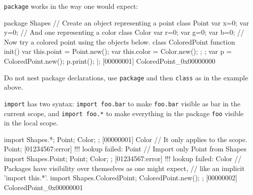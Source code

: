 \lstinline{package} works in the way one would expect:

\begin{urbiscript}
package Shapes
{
  // Create an object representing a point
  class Point { var x=0; var y=0};
  // And one representing a color
  class Color { var r=0; var g=0; var b=0};
  // Now try a colored point using the objects below.
  class ColoredPoint
  {
    function init()
    {
      var this.point = Point.new();
      var this.color = Color.new();
    };
  };
  var p = ColoredPoint.new();
  p.print();
}|;
[00000001] ColoredPoint_0x00000000
\end{urbiscript}

Do not nest package declarations, use \lstinline{package} and then
\lstinline{class} as in the example above.

\lstinline{import} has two syntax: \lstinline{import foo.bar} to make
\lstinline{foo.bar} visible as {bar} in the current scope, and
\lstinline{import foo.*} to make everything in the package \lstinline{foo}
visible in the local scope.

\begin{urbiscript}
{
  import Shapes.*;
  Point;
  Color;
};
[00000001] Color
// It only applies to the scope.
Point;
[01234567:error] !!! lookup failed: Point
{
  // Import only Point from Shapes
  import Shapes.Point;
  Point;
  Color;
};
[01234567:error] !!! lookup failed: Color
// Packages have visibility over themselves as one might expect,
// like an implicit 'import this.*'.
{
  import Shapes.ColoredPoint;
  ColoredPoint.new();
};
[00000002] ColoredPoint_0x00000001
\end{urbiscript}


